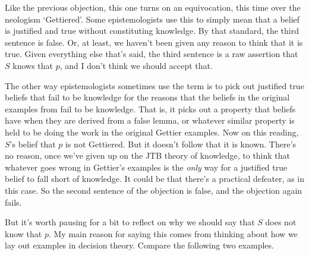 {Like the previous objection, this one turns on an equivocation, this time over the neologism `Gettiered'. Some epistemologists use this to simply mean that a belief is justified and true without constituting knowledge. By that standard, the third sentence is false. Or, at least, we haven't been given any reason to think that it is true. Given everything else that's said, the third sentence is a raw assertion that \(S\) knows that \(p\), and I don't think we should accept that.

The other way epistemologists sometimes use the term is to pick out justified true beliefs that fail to be knowledge for the reasons that the beliefs in the original examples from \citet{Gettier1963} fail to be knowledge. That is, it picks out a property that beliefs have when they are derived from a false lemma, or whatever similar property is held to be doing the work in the original Gettier examples. Now on this reading, \(S\)'s belief that \(p\) is not Gettiered. But it doesn't follow that it is known. There's no reason, once we've given up on the JTB theory of knowledge, to think that whatever goes wrong in Gettier's examples is the \textit{only} way for a justified true belief to fall short of knowledge. It could be that there's a practical defeater, as in this case. So the second sentence of the objection is false, and the objection again fails.

But it's worth pausing for a bit to reflect on why we should say that \(S\) does not know that \(p\). My main reason for saying this comes from thinking about how we lay out examples in decision theory. Compare the following two examples.

}
